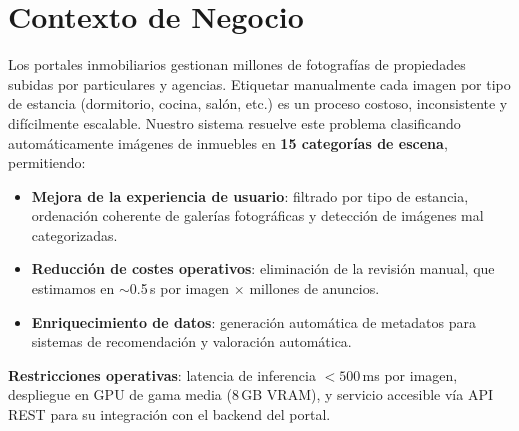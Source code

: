 \documentclass[10pt,a4paper,twocolumn]{article}
\begin{document}

\section{Contexto de Negocio}

Los portales inmobiliarios gestionan millones de fotografías de propiedades subidas por particulares y agencias. Etiquetar manualmente cada imagen por tipo de estancia (dormitorio, cocina, salón, etc.) es un proceso costoso, inconsistente y difícilmente escalable. Nuestro sistema resuelve este problema clasificando automáticamente imágenes de inmuebles en \textbf{15 categorías de escena}, permitiendo:

\begin{itemize}
    \item \textbf{Mejora de la experiencia de usuario}: filtrado por tipo de estancia, ordenación coherente de galerías fotográficas y detección de imágenes mal categorizadas.
    \item \textbf{Reducción de costes operativos}: eliminación de la revisión manual, que estimamos en $\sim$0.5\,s por imagen $\times$ millones de anuncios.
    \item \textbf{Enriquecimiento de datos}: generación automática de metadatos para sistemas de recomendación y valoración automática.
\end{itemize}

\noindent\textbf{Restricciones operativas}: latencia de inferencia $<500$\,ms por imagen, despliegue en GPU de gama media (8\,GB VRAM), y servicio accesible vía API REST para su integración con el backend del portal.
\end{document}
